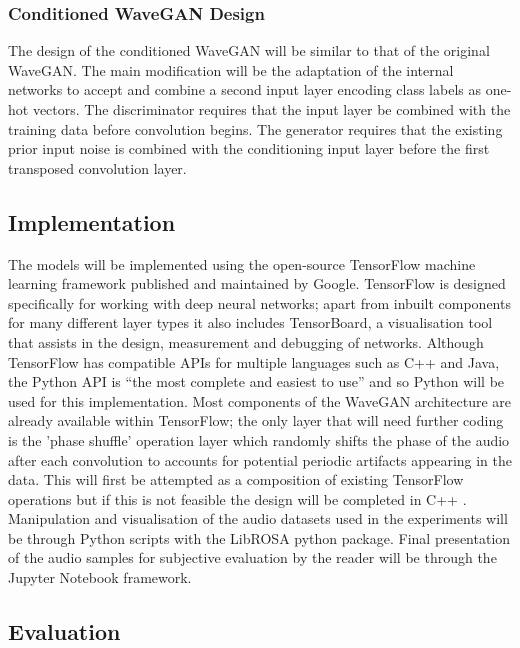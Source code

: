 \documentclass[a4paper, dvipsnames, titlepage]{article}
\begin{document}
\subsubsection{Conditioned WaveGAN Design}

The design of the conditioned WaveGAN will be similar to that of the original WaveGAN.
The main modification will be the adaptation of the internal networks to accept and combine a second input layer encoding class labels as one-hot vectors.
The discriminator requires that the input layer be combined with the training data before convolution begins.
The generator requires that the existing prior input noise is combined with the conditioning input layer before the first transposed convolution layer.

\subsection{Implementation}

The models will be implemented using the open-source TensorFlow machine learning framework published and maintained by Google.
TensorFlow is designed specifically for working with deep neural networks; apart from inbuilt components for many different layer types it also includes TensorBoard, a visualisation tool that assists in the design, measurement and debugging of networks.
Although TensorFlow has compatible APIs for multiple languages such as C++ and Java, the Python API is ``the most complete and easiest to use'' \citep{TensorFlowAPI} and so Python will be used for this implementation.
\newline
\newline
Most components of the WaveGAN architecture are already available within TensorFlow; the only layer that will need further coding is the 'phase shuffle' operation layer which randomly shifts the phase of the audio after each convolution to accounts for potential periodic artifacts appearing in the data.
This will first be attempted as a composition of existing TensorFlow operations but if this is not feasible the design will be completed in C++ \citep{TensorFlowAPIOps}.
\newline
\newline
Manipulation and visualisation of the audio datasets used in the experiments will be through Python scripts with the LibROSA python package.
Final presentation of the audio samples for subjective evaluation by the reader will be through the Jupyter Notebook framework.

\subsection{Evaluation}
\end{document}
